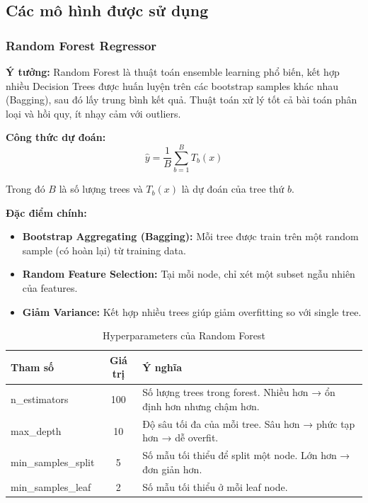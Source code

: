 \documentclass[12pt,a4paper]{article}
\begin{document}
\subsection{Các mô hình được sử dụng}

\subsubsection{Random Forest Regressor}

\textbf{Ý tưởng:} Random Forest là thuật toán ensemble learning phổ biến, kết hợp nhiều Decision Trees được huấn luyện trên các bootstrap samples khác nhau (Bagging), sau đó lấy trung bình kết quả. Thuật toán xử lý tốt cả bài toán phân loại và hồi quy, ít nhạy cảm với outliers.

\textbf{Công thức dự đoán:}
\begin{equation}
\hat{y} = \frac{1}{B} \sum_{b=1}^{B} T_b(x)
\end{equation}

Trong đó $B$ là số lượng trees và $T_b(x)$ là dự đoán của tree thứ $b$.

\textbf{Đặc điểm chính:}
\begin{itemize}
    \item \textbf{Bootstrap Aggregating (Bagging):} Mỗi tree được train trên một random sample (có hoàn lại) từ training data.
    \item \textbf{Random Feature Selection:} Tại mỗi node, chỉ xét một subset ngẫu nhiên của features.
    \item \textbf{Giảm Variance:} Kết hợp nhiều trees giúp giảm overfitting so với single tree.
\end{itemize}

\begin{table}[H]
\centering
\caption{Hyperparameters của Random Forest}
\begin{tabular}{|l|c|p{7cm}|}
\hline
\textbf{Tham số} & \textbf{Giá trị} & \textbf{Ý nghĩa} \\
\hline
n\_estimators & 100 & Số lượng trees trong forest. Nhiều hơn → ổn định hơn nhưng chậm hơn. \\
\hline
max\_depth & 10 & Độ sâu tối đa của mỗi tree. Sâu hơn → phức tạp hơn → dễ overfit. \\
\hline
min\_samples\_split & 5 & Số mẫu tối thiểu để split một node. Lớn hơn → đơn giản hơn. \\
\hline
min\_samples\_leaf & 2 & Số mẫu tối thiểu ở mỗi leaf node. \\
\hline
\end{tabular}
\end{table}
\end{document}
